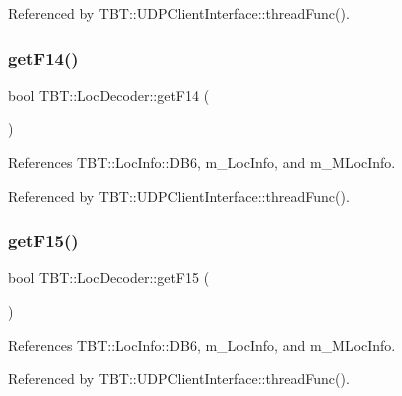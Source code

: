 Referenced by T\+B\+T\+::\+U\+D\+P\+Client\+Interface\+::thread\+Func().

\mbox{\label{classTBT_1_1LocDecoder_a839308828d5775da64621292caa07651_a839308828d5775da64621292caa07651}} 
\subsubsection{\texorpdfstring{get\+F14()}{getF14()}}
{\footnotesize\ttfamily bool T\+B\+T\+::\+Loc\+Decoder\+::get\+F14 (\begin{DoxyParamCaption}{ }\end{DoxyParamCaption})\hspace{0.3cm}{\ttfamily [inline]}}



References T\+B\+T\+::\+Loc\+Info\+::\+D\+B6, m\+\_\+\+Loc\+Info, and m\+\_\+\+M\+Loc\+Info.



Referenced by T\+B\+T\+::\+U\+D\+P\+Client\+Interface\+::thread\+Func().

\mbox{\label{classTBT_1_1LocDecoder_a4bcfbf55ed042a80d5b045eb7915234a_a4bcfbf55ed042a80d5b045eb7915234a}} 
\subsubsection{\texorpdfstring{get\+F15()}{getF15()}}
{\footnotesize\ttfamily bool T\+B\+T\+::\+Loc\+Decoder\+::get\+F15 (\begin{DoxyParamCaption}{ }\end{DoxyParamCaption})\hspace{0.3cm}{\ttfamily [inline]}}



References T\+B\+T\+::\+Loc\+Info\+::\+D\+B6, m\+\_\+\+Loc\+Info, and m\+\_\+\+M\+Loc\+Info.



Referenced by T\+B\+T\+::\+U\+D\+P\+Client\+Interface\+::thread\+Func().

\mbox{\label{classTBT_1_1LocDecoder_a11aa0521314deb69fd50d44eb9f35d8d_a11aa0521314deb69fd50d44eb9f35d8d}} 
